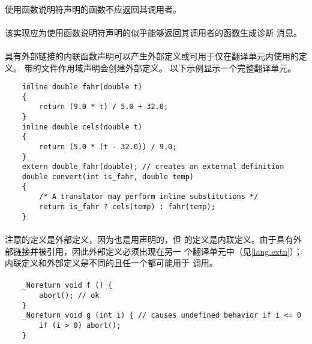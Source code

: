 \paragraph{}
使用函数说明符声明的函数不应返回其调用者。

\recprac
\paragraph{}
该实现应为使用函数说明符声明的似乎能够返回其调用者的函数生成诊断
消息。

\paragraph{}
\ex 具有外部链接的内联函数声明可以产生外部定义或可用于仅在翻译单元内使用的定义。
带的文件作用域声明会创建外部定义。 以下示例显示一个完整翻译单元。
\begin{lstlisting}
    inline double fahr(double t)
    {
        return (9.0 * t) / 5.0 + 32.0;
    }
    inline double cels(double t)
    {
        return (5.0 * (t - 32.0)) / 9.0;
    }
    extern double fahr(double); // creates an external definition
    double convert(int is_fahr, double temp)
    {
        /* A translator may perform inline substitutions */
        return is_fahr ? cels(temp) : fahr(temp);
    }
\end{lstlisting}

\paragraph{}
注意的定义是外部定义，因为也是用声明的，但
的定义是内联定义。由于具有外部链接并被引用，因此外部定义必须出现在另一
个翻译单元中（见\ref{lang.extn}）；内联定义和外部定义是不同的且任一个都可能用于
调用。

\paragraph{}
\ex
\begin{lstlisting}
    _Noreturn void f () {
        abort(); // ok
    }
    _Noreturn void g (int i) { // causes undefined behavior if i <= 0
        if (i > 0) abort();
    }
\end{lstlisting}


\syntax
\paragraph{}

